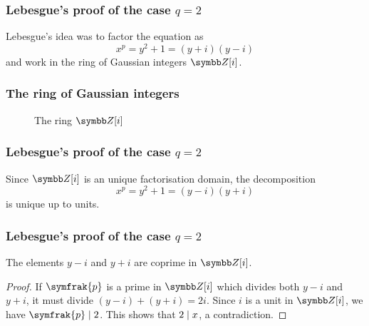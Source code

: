 \begin{frame}
\frametitle{Lebesgue's proof of the case \texorpdfstring{\(q = 2\)}{q = 2}}

Lebesgue's idea \cite{Lebesgue1850} was to factor the equation as
\[
    x^p = y^2 + 1 = (y + i)(y - i)
\]
and work in the ring of Gaussian integers \(\integers[i]\).
\end{frame}

\begin{frame}
\frametitle{The ring of Gaussian integers}

\begin{figure}
    \caption*{The ring \(\integers[i]\)}
\end{figure}
\end{frame}

\begin{frame}
\frametitle{Lebesgue's proof of the case \texorpdfstring{\(q = 2\)}{q = 2}}

Since \(\integers[i]\) is an unique factorisation domain, the decomposition
\[
    x^p = y^2 + 1 = (y - i) (y + i)
\]
is unique up to units.
\end{frame}

\begin{frame}
\frametitle{Lebesgue's proof of the case \texorpdfstring{\(q = 2\)}{q = 2}}

\begin{proposition}
The elements \(y - i\) and \(y + i\) are coprime in \(\integers[i]\).
\end{proposition}

\begin{proof}
If \(\symfrak{p}\) is a prime in \(\integers[i]\) which divides both \(y - i\) and \(y + i\), it must divide \((y - i) + (y + i) = 2i\). Since \(i\) is a unit in \(\integers[i]\), we have \(\symfrak{p} \divides 2\). This shows that \(2 \mid x\), a contradiction.
\end{proof}
\end{frame}

